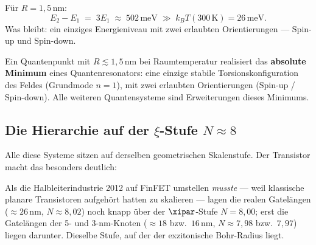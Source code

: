 Für $R = 1{,}5$\,nm:
\begin{equation}
  E_2 - E_1 \;=\; 3 E_1 \;\approx\; 502\,\text{meV}
  \;\gg\; k_BT(300\,\text{K}) = 26\,\text{meV.}
\end{equation}
Was bleibt: ein einziges Energieniveau mit zwei erlaubten
Orientierungen --- Spin-up und Spin-down.

\begin{foundation}
Ein Quantenpunkt mit $R \lesssim 1{,}5$\,nm bei Raumtemperatur
realisiert das \textbf{absolute Minimum} eines Quantenresonators:
eine einzige stabile Torsionskonfiguration des Feldes (Grundmode $n=1$),
mit zwei erlaubten Orientierungen (Spin-up / Spin-down).
Alle weiteren Quantensysteme sind Erweiterungen dieses Minimums.
\end{foundation}

\subsection{Die Hierarchie auf der \texorpdfstring{$\xi$}{xi}-Stufe
  \texorpdfstring{$N \approx 8$}{N~8}}

Alle diese Systeme sitzen auf derselben geometrischen Skalenstufe.
Der Transistor macht das besonders deutlich:

\begin{center}
\end{center}

Als die Halbleiterindustrie 2012 auf FinFET umstellen \emph{musste}
--- weil klassische planare Transistoren aufgehört hatten zu skalieren
--- lagen die realen Gatelängen ($\approx 26$\,nm, $N \approx 8{,}02$) noch knapp über der $\xipar$-Stufe $N = 8{,}00$; erst die Gatelängen der 5- und 3-nm-Knoten ($\approx 18$ bzw.\ $16$\,nm, $N \approx 7{,}98$ bzw.\ $7{,}97$) liegen darunter.
Dieselbe Stufe, auf der der exzitonische Bohr-Radius liegt.

